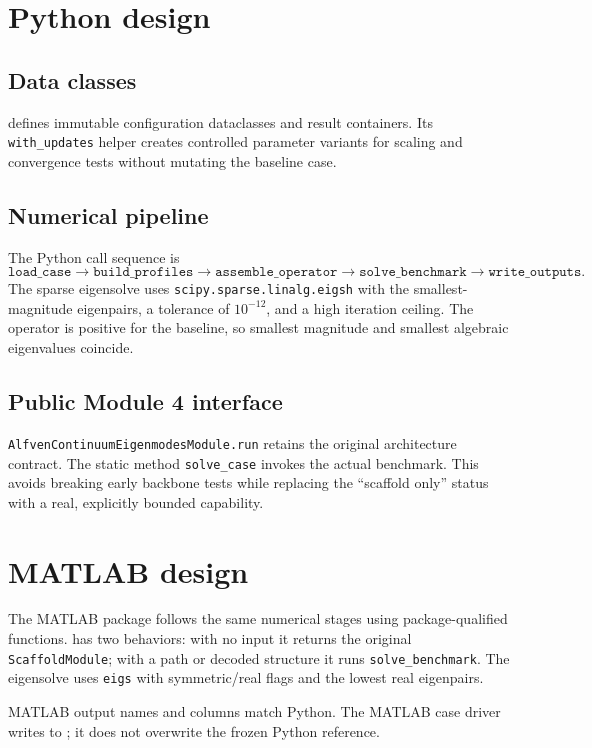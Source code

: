 \documentclass[11pt]{article}
\begin{document}
\section{Python design}
\subsection{Data classes}
 defines immutable configuration dataclasses and result containers. Its \texttt{with\_updates} helper creates controlled parameter variants for scaling and convergence tests without mutating the baseline case.

\subsection{Numerical pipeline}
The Python call sequence is
\begin{equation}
\texttt{load\_case}
\rightarrow
\texttt{build\_profiles}
\rightarrow
\texttt{assemble\_operator}
\rightarrow
\texttt{solve\_benchmark}
\rightarrow
\texttt{write\_outputs}.
\end{equation}
The sparse eigensolve uses \texttt{scipy.sparse.linalg.eigsh} with the smallest-magnitude eigenpairs, a tolerance of $10^{-12}$, and a high iteration ceiling. The operator is positive for the baseline, so smallest magnitude and smallest algebraic eigenvalues coincide.

\subsection{Public Module 4 interface}
\texttt{AlfvenContinuumEigenmodesModule.run} retains the original architecture contract. The static method \texttt{solve\_case} invokes the actual benchmark. This avoids breaking early backbone tests while replacing the ``scaffold only'' status with a real, explicitly bounded capability.

\section{MATLAB design}
The MATLAB package follows the same numerical stages using package-qualified functions.  has two behaviors: with no input it returns the original \texttt{ScaffoldModule}; with a path or decoded structure it runs \texttt{solve\_benchmark}. The eigensolve uses \texttt{eigs} with symmetric/real flags and the lowest real eigenpairs.

MATLAB output names and columns match Python. The MATLAB case driver writes to ; it does not overwrite the frozen Python reference.
\end{document}
